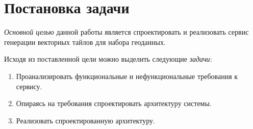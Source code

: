 \section*{\Large{Постановка задачи}}

\textit{Основной целью} данной работы является спроектировать и реализовать сервис генерации векторных тайлов
для набора геоданных.

Исходя из поставленной цели можно выделить следующие \textit{задачи}:
\begin{enumerate}
    \item Проанализировать функциональные и нефункциональные требования к сервису.
    \item Опираясь на требования спроектировать архитектуру системы.
    \item Реализовать спроектированную архитектуру.
\end{enumerate}

